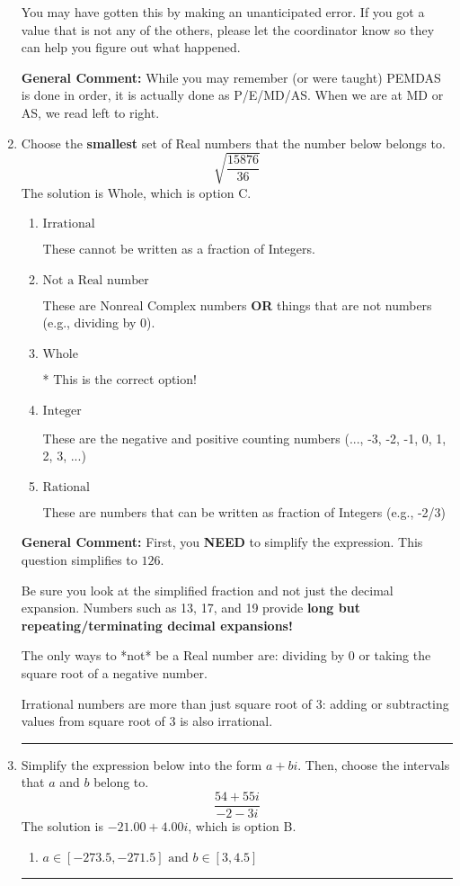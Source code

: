 \documentclass{extbook}[14pt]
\newcommand{\litem}[1]{\item #1

\rule{\textwidth}{0.4pt}}
\begin{document}
\begin{enumerate}
{\begin{enumerate}[label=\Alph*.]
 You may have gotten this by making an unanticipated error. If you got a value that is not any of the others, please let the coordinator know so they can help you figure out what happened.
\end{enumerate}

\textbf{General Comment:} While you may remember (or were taught) PEMDAS is done in order, it is actually done as P/E/MD/AS. When we are at MD or AS, we read left to right.
}
\litem{
Choose the \textbf{smallest} set of Real numbers that the number below belongs to.
\[ \sqrt{\frac{15876}{36}} \]The solution is \( \text{Whole} \), which is option C.\begin{enumerate}[label=\Alph*.]
\item \( \text{Irrational} \)

These cannot be written as a fraction of Integers.
\item \( \text{Not a Real number} \)

These are Nonreal Complex numbers \textbf{OR} things that are not numbers (e.g., dividing by 0).
\item \( \text{Whole} \)

* This is the correct option!
\item \( \text{Integer} \)

These are the negative and positive counting numbers (..., -3, -2, -1, 0, 1, 2, 3, ...)
\item \( \text{Rational} \)

These are numbers that can be written as fraction of Integers (e.g., -2/3)
\end{enumerate}

\textbf{General Comment:} First, you \textbf{NEED} to simplify the expression. This question simplifies to $126$. 
 
 Be sure you look at the simplified fraction and not just the decimal expansion. Numbers such as 13, 17, and 19 provide \textbf{long but repeating/terminating decimal expansions!} 
 
 The only ways to *not* be a Real number are: dividing by 0 or taking the square root of a negative number. 
 
 Irrational numbers are more than just square root of 3: adding or subtracting values from square root of 3 is also irrational.
}
\litem{
Simplify the expression below into the form $a+bi$. Then, choose the intervals that $a$ and $b$ belong to.
\[ \frac{54 + 55 i}{-2 - 3 i} \]The solution is \( -21.00  + 4.00 i \), which is option B.\begin{enumerate}[label=\Alph*.]
\item \( a \in [-273.5, -271.5] \text{ and } b \in [3, 4.5] \)


\end{enumerate}}
\end{enumerate}
\end{document}
